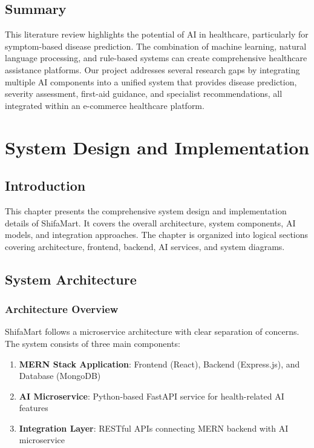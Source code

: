 \documentclass[12pt,a4paper]{article}
\begin{document}
\section{Summary}
This literature review highlights the potential of AI in healthcare, particularly for symptom-based disease prediction. The combination of machine learning, natural language processing, and rule-based systems can create comprehensive healthcare assistance platforms. Our project addresses several research gaps by integrating multiple AI components into a unified system that provides disease prediction, severity assessment, first-aid guidance, and specialist recommendations, all integrated within an e-commerce healthcare platform.


\chapter{System Design and Implementation}
\vspace{0.5cm}

\section{Introduction}
This chapter presents the comprehensive system design and implementation details of ShifaMart. It covers the overall architecture, system components, AI models, and integration approaches. The chapter is organized into logical sections covering architecture, frontend, backend, AI services, and system diagrams.

\section{System Architecture}

\subsection{Architecture Overview}
ShifaMart follows a microservice architecture with clear separation of concerns. The system consists of three main components:

\begin{enumerate}
    \item \textbf{MERN Stack Application}: Frontend (React), Backend (Express.js), and Database (MongoDB)
    \item \textbf{AI Microservice}: Python-based FastAPI service for health-related AI features
    \item \textbf{Integration Layer}: RESTful APIs connecting MERN backend with AI microservice
\end{enumerate}
\end{document}
